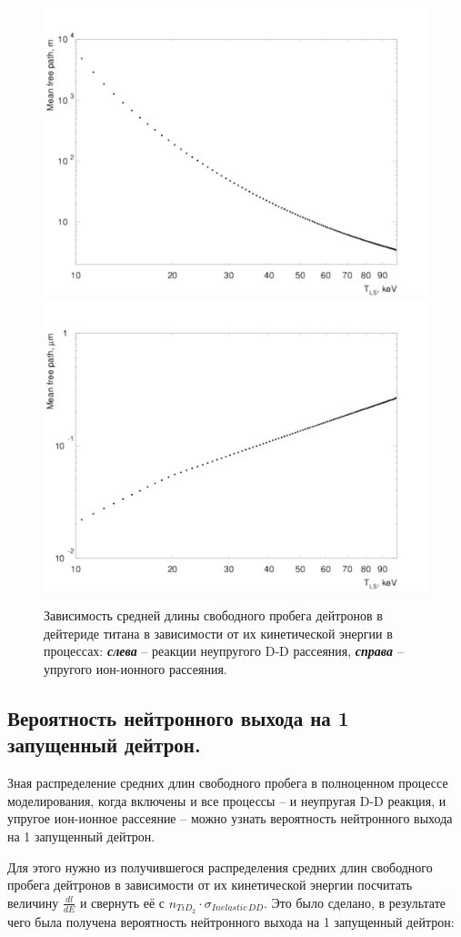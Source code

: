 \documentclass[a4paper,12pt]{article}
\begin{document}
\begin{large}
\begin{figure}[ht]
  {
     \includegraphics[width=0.5\linewidth]{images/fluence_inelastic.pdf}
     \includegraphics[width=0.5\linewidth]{images/fluence_elastic.pdf}
  }
  \caption{Зависимость средней длины свободного пробега дейтронов в дейтериде титана в зависимости от их кинетической энергии в процессах: \textbf{\textit{слева}} -- реакции неупругого D-D рассеяния, \textbf{\textit{справа}} -- упругого ион-ионного рассеяния.}
  \label{fig:RangesOfDeuteronsInInelasticAndElasticProcesses}
\end{figure}
	
\subsection{Вероятность нейтронного выхода на 1 запущенный дейтрон.}
\label{ProbabilityOfNeutronOutputPer1Deuteron}

	Зная распределение средних длин свободного пробега в полноценном процессе моделирования, когда включены и все процессы -- и неупругая D-D реакция, и упругое ион-ионное рассеяние -- можно узнать вероятность нейтронного выхода на 1 запущенный дейтрон.
	
	Для этого нужно из получившегося распределения средних длин свободного пробега дейтронов в зависимости от их кинетической энергии посчитать величину $\frac{dl}{dE}$  и свернуть её с $n_{TiD_2} \cdot \sigma_{Inelastic\,DD}$. Это было сделано, в результате чего была получена вероятность нейтронного выхода на 1 запущенный дейтрон:
	

\end{large}
\end{document}
